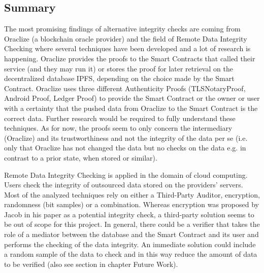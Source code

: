 \subsection{Summary}
The most promising findings of alternative integrity checks are coming from Oraclize (a blockchain oracle provider) and the field of Remote Data Integrity Checking where several techniques have been developed and a lot of research is happening.
Oraclize provides the proofs to the Smart Contracts that called their service (and they may run it) or stores the proof for later retrieval on the decentralized database IPFS, depending on the choice made by the Smart Contract. Oraclize uses three different Authenticity Proofs (TLSNotaryProof, Android Proof, Ledger Proof) to provide the Smart Contract or the owner or user with a certainty that the pushed data from Oraclize to the Smart Contract is the correct data. Further research would be required to fully understand these techniques. As for now, the proofs seem to only concern the intermediary (Oraclize) and its trustworthiness and not the integrity of the data per se (i.e. only that Oraclize has not changed the data but no checks on the data e.g. in contrast to a prior state, when stored or similar).

Remote Data Integrity Checking is applied in the domain of cloud computing. Users check the integrity of outsourced data stored on the providers’ servers. Most of the analyzed techniques rely on either a Third-Party Auditor, encryption, randomness (bit samples) or a combination. Whereas encryption was proposed by Jacob in his paper as a potential integrity check, a third-party solution seems to be out of scope for this project. In general, there could be a verifier that takes the role of a mediator between the database and the Smart Contract and its user and performs the checking of the data integrity. An immediate solution could include a random sample of the data to check and in this way reduce the amount of data to be verified (also see section in chapter Future Work).

